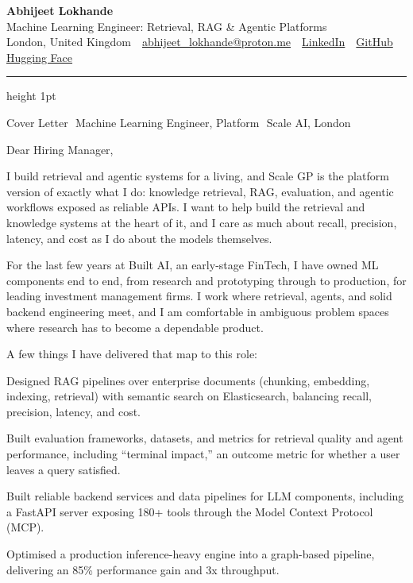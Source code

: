 \documentclass[10pt,a4paper]{article}
\newcommand{\sep}{\,\textcolor{accent!60}{\textbar}\,}
\begin{document}
\begin{center}
  {\fontsize{22}{24}\selectfont\bfseries Abhijeet Lokhande}\\[3pt]
  {\color{accent}\large Machine Learning Engineer: Retrieval, RAG \& Agentic Platforms}\\[5pt]
  {\small
    London, United Kingdom \sep
    \href{mailto:abhijeet_lokhande@proton.me}{abhijeet\_lokhande@proton.me} \sep
    \href{https://www.linkedin.com/in/ablds/}{LinkedIn} \sep
    \href{https://github.com/abhijeetscode}{GitHub} \sep
    \href{https://huggingface.co/ab-ai}{Hugging Face}
  }
\end{center}

{\color{accent!35}\hrule height 1pt}
\vspace{4pt}

{\color{muted}\small Cover Letter \sep Machine Learning Engineer, Platform \sep Scale AI, London}

\vspace{2pt}

Dear Hiring Manager,

I build retrieval and agentic systems for a living, and Scale GP is the platform version of exactly what I do: knowledge retrieval, RAG, evaluation, and agentic workflows exposed as reliable APIs. I want to help build the retrieval and knowledge systems at the heart of it, and I care as much about recall, precision, latency, and cost as I do about the models themselves.

For the last few years at Built AI, an early-stage FinTech, I have owned ML components end to end, from research and prototyping through to production, for leading investment management firms. I work where retrieval, agents, and solid backend engineering meet, and I am comfortable in ambiguous problem spaces where research has to become a dependable product.

A few things I have delivered that map to this role:

\begin{tight}
  \item Designed RAG pipelines over enterprise documents (chunking, embedding, indexing, retrieval) with semantic search on Elasticsearch, balancing recall, precision, latency, and cost.
  \item Built evaluation frameworks, datasets, and metrics for retrieval quality and agent performance, including ``terminal impact,'' an outcome metric for whether a user leaves a query satisfied.
  \item Built reliable backend services and data pipelines for LLM components, including a FastAPI server exposing 180+ tools through the Model Context Protocol (MCP).
  \item Optimised a production inference-heavy engine into a graph-based pipeline, delivering an 85\% performance gain and 3x throughput.
\end{tight}
\end{document}
